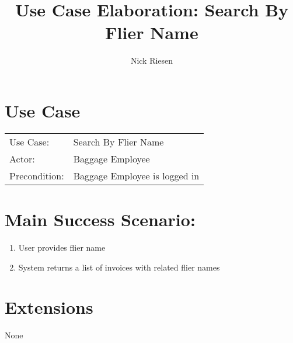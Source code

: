 \documentclass{article}
\title{Use Case Elaboration: Search By Flier Name}
\author{ Nick Riesen }
\begin{document}
\maketitle


\section*{Use Case}
\begin{tabular}{l l}
Use Case:     & Search By Flier Name          \\
Actor:        & Baggage Employee              \\
Precondition: & Baggage Employee is logged in \\
\end{tabular}


\section*{Main Success Scenario:}

\begin{enumerate}
    \item  User provides flier name
    \item System returns a list of invoices with related flier names

\end{enumerate}

\section*{Extensions}
None
\end{document}
